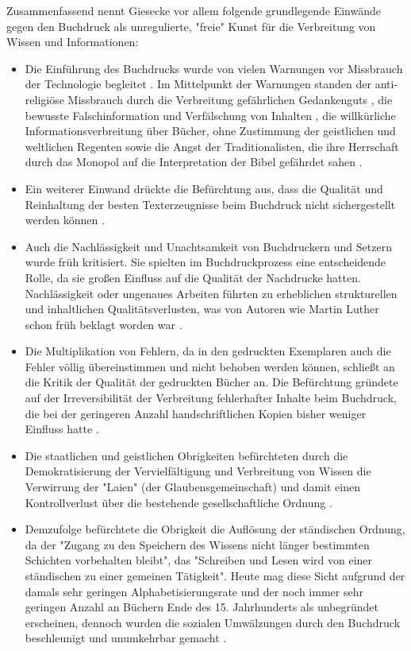 Zusammenfassend nennt Giesecke vor allem folgende grundlegende Einwände gegen den Buchdruck als unregulierte, "freie" Kunst \cite{Giesecke_1991} für die Verbreitung von Wissen und Informationen:
\begin{itemize}
\item Die Einführung des Buchdrucks wurde von vielen Warnungen vor Missbrauch der Technologie begleitet \cite{Lange_2008}. Im Mittelpunkt der Warnungen standen der anti-religiöse Missbrauch durch die Verbreitung gefährlichen Gedankenguts \cite{Kruse_2003}, die bewusste Falschinformation und Verfälschung von Inhalten \cite{Besch_1998}, die willkürliche Informationsverbreitung über Bücher, ohne Zustimmung der geistlichen und weltlichen Regenten \cite{Rother_2002} sowie die Angst der Traditionalisten, die ihre Herrschaft durch das Monopol auf die Interpretation der Bibel gefährdet sahen \cite{Lange_2008}.
\item Ein weiterer Einwand drückte die Befürchtung aus, dass die Qualität und Reinhaltung der besten Texterzeugnisse beim Buchdruck nicht sichergestellt werden können \cite{Giesecke_1991}.
\item Auch die Nachlässigkeit und Unachtsamkeit von Buchdruckern und Setzern wurde früh kritisiert. Sie spielten im Buchdruckprozess eine entscheidende Rolle, da sie großen Einfluss auf die Qualität der Nachdrucke hatten. Nachlässigkeit oder ungenaues Arbeiten führten zu erheblichen strukturellen und inhaltlichen Qualitätsverlusten, was von Autoren wie Martin Luther schon früh beklagt worden war \cite{Besch_1998} \cite{Stober_2014} \cite{Luther_1876}.
\item Die Multiplikation von Fehlern, da in den gedruckten Exemplaren auch die Fehler völlig übereinstimmen und nicht behoben werden können, schließt an die Kritik der Qualität der gedruckten Bücher an. Die Befürchtung gründete auf der Irreversibilität der Verbreitung fehlerhafter Inhalte beim Buchdruck, die bei der geringeren Anzahl handschriftlichen Kopien bisher weniger Einfluss hatte \cite{Kittler_2004}.
\item Die staatlichen und geistlichen Obrigkeiten befürchteten durch die Demokratisierung der Vervielfältigung und Verbreitung von Wissen die Verwirrung der "Laien" (der Glaubensgemeinschaft) und damit einen Kontrollverlust über die bestehende gesellschaftliche Ordnung \cite{Giesecke_1991}.
\item Demzufolge befürchtete die Obrigkeit die Auflösung der ständischen Ordnung, da der "Zugang zu den Speichern des Wissens nicht länger bestimmten Schichten vorbehalten bleibt", das "Schreiben und Lesen wird von einer ständischen zu einer gemeinen Tätigkeit". Heute mag diese Sicht aufgrund der damals sehr geringen Alphabetisierungsrate und der noch immer sehr geringen Anzahl an Büchern Ende des 15. Jahrhunderts als unbegründet erscheinen, dennoch wurden die sozialen Umwälzungen durch den Buchdruck beschleunigt und unumkehrbar gemacht \cite{Giesecke_1991}.

\end{itemize}
